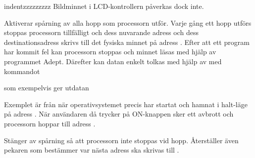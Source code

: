 \documentclass[main.tex]{subfiles}
\begin{document}
\begin{labeling}{indentzzzzzzzzz}
    Bildminnet i LCD-kontrollern påverkas dock inte.
\item[\mono{trace\_enable}]
    Aktiverar spårning av alla hopp som processorn utför. Varje gång ett hopp
    utförs stoppas processorn tillfälligt och dess nuvarande adress och dess
    destinationsadress skrivs till det fysiska minnet på adress .
    Efter att ett program har kommit fel kan processorn stoppas och minnet
    läsas med hjälp av programmet Adept. Därefter kan datan enkelt tolkas med
    hjälp av  med kommandot
    
    som exempelvis ger utdatan
    
    Exemplet är från när operativsystemet precis har startat och hamnat i
    halt-läge på adress . När användaren då trycker på ON-knappen
    sker ett avbrott och processorn hoppar till adress .
\item[\mono{trace\_disable}]
    Stänger av spårning så att processorn inte stoppas vid hopp. Återställer
    även pekaren som bestämmer var nästa adress ska skrivas till
    .
\end{labeling}

\clearpage
\end{document}

